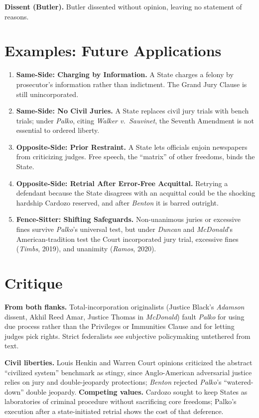 \documentclass[12pt]{article}
\begin{document}
\textbf{Dissent (Butler).} Butler dissented without opinion, leaving no statement of reasons.

\section{Examples: Future Applications}

\begin{enumerate}
\item \textbf{Same-Side: Charging by Information.} A State charges a felony by prosecutor's information rather than indictment. The Grand Jury Clause is still unincorporated.
\item \textbf{Same-Side: No Civil Juries.} A State replaces civil jury trials with bench trials; under \textit{Palko}, citing \textit{Walker v.\ Sauvinet}, the Seventh Amendment is not essential to ordered liberty.
\item \textbf{Opposite-Side: Prior Restraint.} A State lets officials enjoin newspapers from criticizing judges. Free speech, the ``matrix'' of other freedoms, binds the State.
\item \textbf{Opposite-Side: Retrial After Error-Free Acquittal.} Retrying a defendant because the State disagrees with an acquittal could be the shocking hardship Cardozo reserved, and after \textit{Benton} it is barred outright.
\item \textbf{Fence-Sitter: Shifting Safeguards.} Non-unanimous juries or excessive fines survive \textit{Palko}'s universal test, but under \textit{Duncan} and \textit{McDonald}'s American-tradition test the Court incorporated jury trial, excessive fines (\textit{Timbs}, 2019), and unanimity (\textit{Ramos}, 2020).
\end{enumerate}

\section{Critique}

\textbf{From both flanks.} Total-incorporation originalists (Justice Black's \textit{Adamson} dissent, Akhil Reed Amar, Justice Thomas in \textit{McDonald}) fault \textit{Palko} for using due process rather than the Privileges or Immunities Clause and for letting judges pick rights. Strict federalists see subjective policymaking untethered from text.

\textbf{Civil liberties.} Louis Henkin and Warren Court opinions criticized the abstract ``civilized system'' benchmark as stingy, since Anglo-American adversarial justice relies on jury and double-jeopardy protections; \textit{Benton} rejected \textit{Palko}'s ``watered-down'' double jeopardy. \textbf{Competing values.} Cardozo sought to keep States as laboratories of criminal procedure without sacrificing core freedoms; Palko's execution after a state-initiated retrial shows the cost of that deference.
\end{document}

